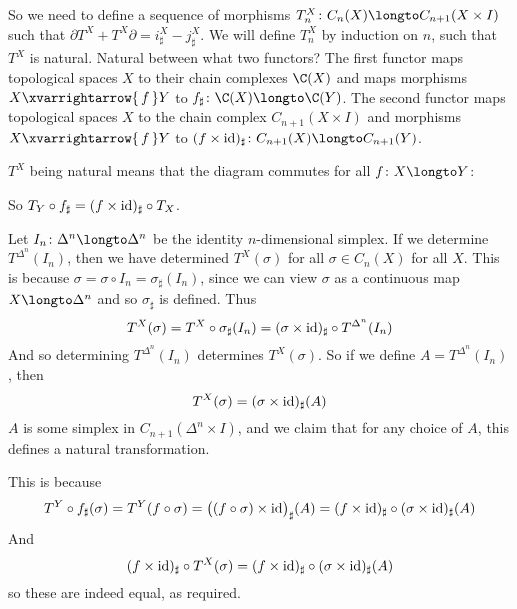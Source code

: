 So we need to define a sequence of morphisms $T_n^X\colon C_n(X)\longto C_{n+1}(X\times I)$ such that $\partial T^X+T^X\partial=i^X_\sharp-j^X_\sharp$.
We will define $T^X_n$ by induction on $n$, such that $T^X$ is natural.
Natural between what two functors?
The first functor maps topological spaces $X$ to their chain complexes $\C(X)$ and maps morphisms $X\xvarrightarrow{\,f\,}Y$ to $f_\sharp\colon\C(X)\longto\C(Y)$.
The second functor maps topological spaces $X$ to the chain complex $C_{n+1}(X\times I)$ and morphisms $X\xvarrightarrow{\,f\,}Y$ to $(f\times{\rm id})_\sharp\colon C_{n+1}(X)\longto C_{n+1}(Y)$.

$T^X$ being natural means that the diagram commutes for all $f\colon X\longto Y$:

\bigskip
\centerline{\def\diagrowbuf{.5cm}\def\diagcolbuf{.5cm}
}
\medskip

So $T_Y\circ f_\sharp=(f\times{\rm id})_\sharp\circ T_X$.

Let $I_n\colon\Delta^n\longto\Delta^n$ be the identity $n$-dimensional simplex.
If we determine $T^{\Delta^n}(I_n)$, then we have determined $T^X(\sigma)$ for all $\sigma\in C_n(X)$ for all $X$.
This is because $\sigma=\sigma\circ I_n=\sigma_\sharp(I_n)$, since we can view $\sigma$ as a continuous map $X\longto\Delta^n$ and so $\sigma_\sharp$ is defined.
Thus
$$ T^X(\sigma) = T^X\circ\sigma_\sharp(I_n) = (\sigma\times{\rm id})_\sharp\circ T^{\Delta^n}(I_n) $$
And so determining $T^{\Delta^n}(I_n)$ determines $T^X(\sigma)$.
So if we define $A=T^{\Delta^n}(I_n)$, then
$$ T^X(\sigma)=(\sigma\times{\rm id})_\sharp(A) $$
$A$ is some simplex in $C_{n+1}(\Delta^n\times I)$, and we claim that for any choice of $A$, this defines a natural transformation.

This is because
$$ T^Y\circ f_\sharp(\sigma) = T^Y(f\circ\sigma) = \bigl((f\circ\sigma)\times{\rm id}\bigr)_\sharp(A) = (f\times{\rm id})_\sharp\circ(\sigma\times{\rm id})_\sharp(A) $$
And
$$ (f\times{\rm id})_\sharp\circ T^X(\sigma) = (f\times{\rm id})_\sharp\circ(\sigma\times{\rm id})_\sharp(A) $$
so these are indeed equal, as required.

